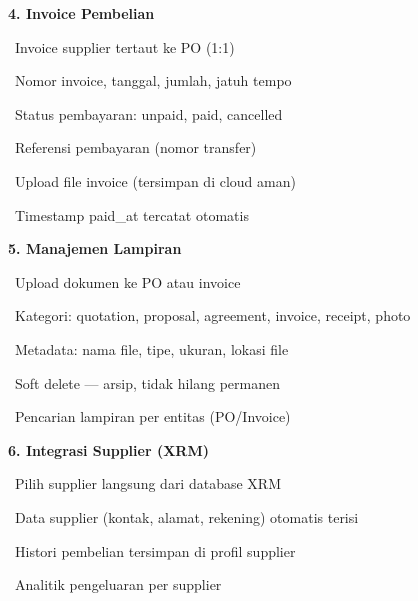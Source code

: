 \documentclass[a4paper]{article}
\begin{document}
\hfill%
\begin{minipage}[t]{0.485\textwidth}

    {\fontsize{10.5}{13}\selectfont\bfseries\color{OrangePrimary} 4. Invoice Pembelian}
    \vspace{3pt}

    {\fontsize{9}{13}\selectfont\color{TextDark}%
    \textbullet\ Invoice supplier tertaut ke PO (1:1)\par\vspace{2pt}%
    \textbullet\ Nomor invoice, tanggal, jumlah, jatuh tempo\par\vspace{2pt}%
    \textbullet\ Status pembayaran: unpaid, paid, cancelled\par\vspace{2pt}%
    \textbullet\ Referensi pembayaran (nomor transfer)\par\vspace{2pt}%
    \textbullet\ Upload file invoice (tersimpan di cloud aman)\par\vspace{2pt}%
    \textbullet\ Timestamp paid\_at tercatat otomatis}%
    \vspace{8pt}

    {\fontsize{10.5}{13}\selectfont\bfseries\color{OrangePrimary} 5. Manajemen Lampiran}
    \vspace{3pt}

    {\fontsize{9}{13}\selectfont\color{TextDark}%
    \textbullet\ Upload dokumen ke PO atau invoice\par\vspace{2pt}%
    \textbullet\ Kategori: quotation, proposal, agreement, invoice, receipt, photo\par\vspace{2pt}%
    \textbullet\ Metadata: nama file, tipe, ukuran, lokasi file\par\vspace{2pt}%
    \textbullet\ Soft delete --- arsip, tidak hilang permanen\par\vspace{2pt}%
    \textbullet\ Pencarian lampiran per entitas (PO/Invoice)}%
    \vspace{8pt}

    {\fontsize{10.5}{13}\selectfont\bfseries\color{OrangePrimary} 6. Integrasi Supplier (XRM)}
    \vspace{3pt}

    {\fontsize{9}{13}\selectfont\color{TextDark}%
    \textbullet\ Pilih supplier langsung dari database XRM\par\vspace{2pt}%
    \textbullet\ Data supplier (kontak, alamat, rekening) otomatis terisi\par\vspace{2pt}%
    \textbullet\ Histori pembelian tersimpan di profil supplier\par\vspace{2pt}%
    \textbullet\ Analitik pengeluaran per supplier}%

\end{minipage}
\end{document}

